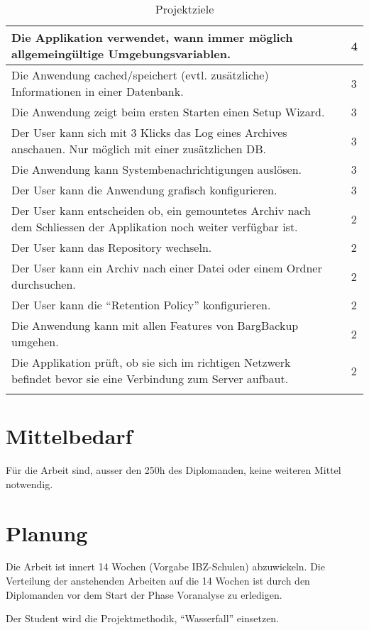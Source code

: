 \begin{longtable}{|p{9cm}|p{1.5cm}|p{2cm}|}
\hline
Die Applikation verwendet, wann immer möglich allgemeingültige Umgebungsvariablen. &  & 4\\
\hline
Die Anwendung cached/speichert (evtl. zusätzliche) Informationen in einer Datenbank. &  & 3\\
\hline
Die Anwendung zeigt beim ersten Starten einen Setup Wizard. &  & 3\\
\hline
Der User kann sich mit 3 Klicks das Log eines Archives anschauen. Nur möglich mit einer zusätzlichen DB. &  & 3\\
\hline
Die Anwendung kann Systembenachrichtigungen auslösen. &  & 3\\
\hline
Der User kann die Anwendung grafisch konfigurieren. &  & 3\\
\hline
Der User kann entscheiden ob, ein gemountetes Archiv nach dem Schliessen der Applikation noch weiter verfügbar ist. &  & 2\\
\hline
Der User kann das Repository wechseln. &  & 2\\
\hline
Der User kann ein Archiv nach einer Datei oder einem Ordner durchsuchen. &  & 2\\
\hline
Der User kann die "`Retention Policy"' konfigurieren. &  & 2\\
\hline
Die Anwendung kann mit allen Features von BargBackup umgehen. &  & 2\\
\hline
Die Applikation prüft, ob sie sich im richtigen Netzwerk befindet bevor sie eine Verbindung zum Server aufbaut. &  & 2\\
\hline
\caption{\label{tab:org09fcf8c}
Projektziele}
\\
\end{longtable}
\newpage
\section{Mittelbedarf}
\label{sec:org6659b3a}
Für die Arbeit sind, ausser den 250h des Diplomanden, keine weiteren Mittel
notwendig.

\section{Planung}
\label{sec:orge346b0e}

Die Arbeit ist innert 14 Wochen (Vorgabe IBZ-Schulen) abzuwickeln. Die
Verteilung der anstehenden Arbeiten auf die 14 Wochen ist durch den Diplomanden
vor dem Start der Phase Voranalyse zu erledigen.

Der Student wird die Projektmethodik, "`Wasserfall"' einsetzen.

